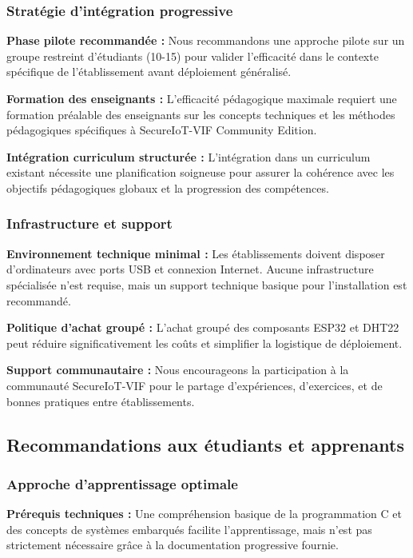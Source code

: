 \subsubsection{Stratégie d'intégration progressive}

\textbf{Phase pilote recommandée :} Nous recommandons une approche pilote sur un groupe restreint d'étudiants (10-15) pour valider l'efficacité dans le contexte spécifique de l'établissement avant déploiement généralisé.

\textbf{Formation des enseignants :} L'efficacité pédagogique maximale requiert une formation préalable des enseignants sur les concepts techniques et les méthodes pédagogiques spécifiques à SecureIoT-VIF Community Edition.

\textbf{Intégration curriculum structurée :} L'intégration dans un curriculum existant nécessite une planification soigneuse pour assurer la cohérence avec les objectifs pédagogiques globaux et la progression des compétences.

\subsubsection{Infrastructure et support}

\textbf{Environnement technique minimal :} Les établissements doivent disposer d'ordinateurs avec ports USB et connexion Internet. Aucune infrastructure spécialisée n'est requise, mais un support technique basique pour l'installation est recommandé.

\textbf{Politique d'achat groupé :} L'achat groupé des composants ESP32 et DHT22 peut réduire significativement les coûts et simplifier la logistique de déploiement.

\textbf{Support communautaire :} Nous encourageons la participation à la communauté SecureIoT-VIF pour le partage d'expériences, d'exercices, et de bonnes pratiques entre établissements.

\subsection{Recommandations aux étudiants et apprenants}

\subsubsection{Approche d'apprentissage optimale}

\textbf{Prérequis techniques :} Une compréhension basique de la programmation C et des concepts de systèmes embarqués facilite l'apprentissage, mais n'est pas strictement nécessaire grâce à la documentation progressive fournie.


